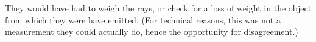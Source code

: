 They would have had to weigh the rays, or check for a loss of weight  in
 the object from which they were have
emitted.  (For technical reasons, this was not a measurement
 they could actually do, hence the opportunity for
disagreement.)



